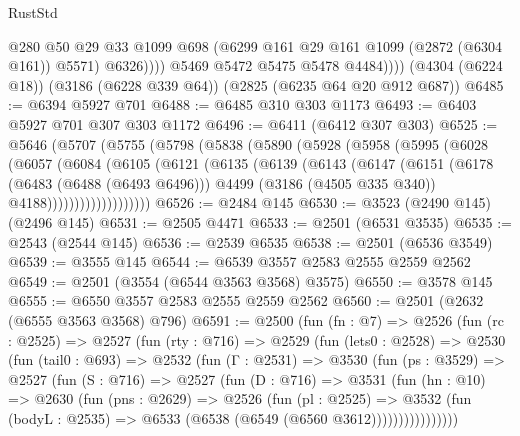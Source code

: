 \begin{lexlean}{RustStd}
\begin{coremodule}
{\begin{coremodule}
{{{{{{{{{{{{{{{{{{{{                    @280
                    @50
                    @29
                    @33
                    @1099
                    @698
                    (@6299 @161 @29 @161 @1099 (@2872 (@6304 @161)) @5571)
                    @6326))))
            @5469
            @5472
            @5475
            @5478
            @4484))))
    (@4304 (@6224 @18))
    (@3186 (@6228 @339 @64))
    (@2825 (@6235 @64 @20 @912 @687))
@6485 := @6394 @5927 @701
@6488 := @6485 @310 @303 @1173
@6493 := @6403 @5927 @701 @307 @303 @1172
@6496 := @6411 (@6412 @307 @303)
@6525 := @5646
    (@5707
      (@5755
        (@5798
          (@5838
            (@5890
              (@5928
                (@5958
                  (@5995
                    (@6028
                      (@6057
                        (@6084
                          (@6105
                            (@6121
                              (@6135
                                (@6139
                                  (@6143
                                    (@6147
                                      (@6151
                                        (@6178
                                          (@6483 (@6488 (@6493 @6496)))
                                          @4499
                                          (@3186 (@4505 @335 @340))
                                          @4188)))))))))))))))))))
@6526 := @2484 @145
@6530 := @3523 (@2490 @145) (@2496 @145)
@6531 := @2505 @4471
@6533 := @2501 (@6531 @3535)
@6535 := @2543 (@2544 @145)
@6536 := @2539 @6535
@6538 := @2501 (@6536 @3549)
@6539 := @3555 @145
@6544 := @6539 @3557 @2583 @2555 @2559 @2562
@6549 := @2501 (@3554 (@6544 @3563 @3568) @3575)
@6550 := @3578 @145
@6555 := @6550 @3557 @2583 @2555 @2559 @2562
@6560 := @2501 (@2632 (@6555 @3563 @3568) @796)
@6591 := @2500
    (fun (fn : @7) =>
    @2526
      (fun (rc : @2525) =>
      @2527
        (fun (rty : @716) =>
        @2529
          (fun (lets0 : @2528) =>
          @2530
            (fun (tail0 : @693) =>
            @2532
              (fun (Γ : @2531) =>
              @3530
                (fun (ps : @3529) =>
                @2527
                  (fun (S : @716) =>
                  @2527
                    (fun (D : @716) =>
                    @3531
                      (fun (hn : @10) =>
                      @2630
                        (fun (pns : @2629) =>
                        @2526
                          (fun (pl : @2525) =>
                          @3532
                            (fun (bodyL : @2535) => @6533 (@6538 (@6549 (@6560 @3612))))))))))))))))
}}}}}}}}}}}}}}}}}}}}
\end{coremodule}}
\end{coremodule}
\end{lexlean}
